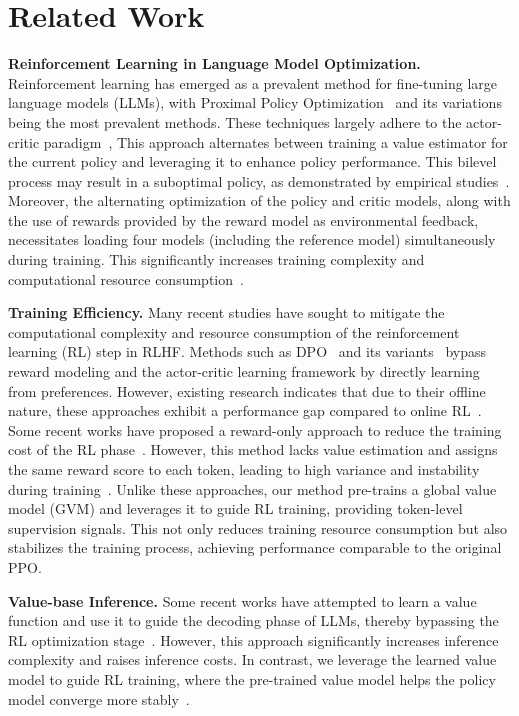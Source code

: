 \section{Related Work}
\label{related work}


\textbf{Reinforcement Learning in Language Model Optimization.}
Reinforcement learning has emerged as a prevalent method for fine-tuning large language models (LLMs), with Proximal Policy Optimization~\cite{schulman2017proximal} and its variations~\cite{ramamurthy2022reinforcement,wu2023pairwise} being the most prevalent methods. These techniques largely adhere to the actor-critic paradigm~\cite{sutton2018reinforcement}, This approach alternates between training a value estimator for the current policy and leveraging it to enhance policy performance. This bilevel process may result in a suboptimal policy, as demonstrated by empirical studies~\cite{gao2023scaling}. Moreover, the alternating optimization of the policy and critic models, along with the use of rewards provided by the reward model as environmental feedback, necessitates loading four models (including the reference model) simultaneously during training. This significantly increases training complexity and computational resource consumption~\cite{yao2023deepspeed,hu2024openrlhf}.

\textbf{Training Efficiency.} Many recent studies have sought to mitigate the computational complexity and resource consumption of the reinforcement learning (RL) step in RLHF. Methods such as DPO~\cite{rafailov2024direct} and its variants~\cite{meng2024simpo,ethayarajh2024kto,hong2024orpo} bypass reward modeling and the actor-critic learning framework by directly learning from preferences. However, existing research indicates that due to their offline nature, these approaches exhibit a performance gap compared to online RL~\cite{xu2024dpo}. Some recent works have proposed a reward-only approach to reduce the training cost of the RL phase~\cite{li2023remax,gunter2024apple,shao2024deepseekmath,ahmadian2024back}. However, this method lacks value estimation and assigns the same reward score to each token, leading to high variance and instability during training~\cite{hu2025reinforce++}. Unlike these approaches, our method pre-trains a global value model (GVM) and leverages it to guide RL training, providing token-level supervision signals. This not only reduces training resource consumption but also stabilizes the training process, achieving performance comparable to the original PPO.

\textbf{Value-base Inference.} 
Some recent works have attempted to learn a value function and use it to guide the decoding phase of LLMs, thereby bypassing the RL optimization stage~\cite{han2024value,kong2024aligning,mao2024don}. However, this approach significantly increases inference complexity and raises inference costs. In contrast, we leverage the learned value model to guide RL training, where the pre-trained value model helps the policy model converge more stably~\cite{noukhovitch2024language}.